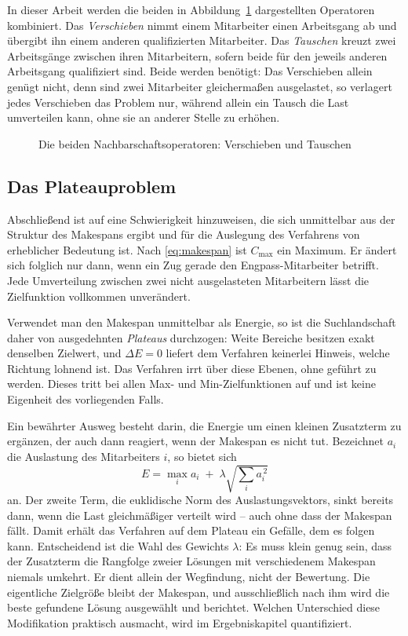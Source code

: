 In dieser Arbeit werden die beiden in Abbildung~\ref{abb:nachbarschaft}
dargestellten Operatoren kombiniert. Das \emph{Verschieben}
nimmt einem Mitarbeiter einen Arbeitsgang ab und übergibt ihn einem anderen
qualifizierten Mitarbeiter. Das \emph{Tauschen} kreuzt
zwei Arbeitsgänge zwischen ihren Mitarbeitern, sofern beide für den jeweils
anderen Arbeitsgang qualifiziert sind. Beide werden benötigt: Das Verschieben
allein genügt nicht, denn sind zwei Mitarbeiter gleichermaßen ausgelastet, so
verlagert jedes Verschieben das Problem nur, während allein ein Tausch die Last
umverteilen kann, ohne sie an anderer Stelle zu erhöhen.

\begin{figure}[tb]
  \centering
  
  \caption[Nachbarschaftsoperatoren]{Die beiden Nachbarschaftsoperatoren: Verschieben und Tauschen}
  \label{abb:nachbarschaft}
\end{figure}

\subsection{Das Plateauproblem}

Abschließend ist auf eine Schwierigkeit hinzuweisen, die sich unmittelbar aus
der Struktur des Makespans ergibt und für die Auslegung des Verfahrens von
erheblicher Bedeutung ist. Nach \eqref{eq:makespan} ist $C_{\max}$ ein Maximum.
Er ändert sich folglich nur dann, wenn ein Zug gerade den Engpass-Mitarbeiter
betrifft. Jede Umverteilung zwischen zwei nicht ausgelasteten Mitarbeitern
lässt die Zielfunktion vollkommen unverändert.

Verwendet man den Makespan unmittelbar als Energie, so ist die Suchlandschaft
daher von ausgedehnten \emph{Plateaus} durchzogen: Weite Bereiche
besitzen exakt denselben Zielwert, und $\Delta E = 0$ liefert dem Verfahren
keinerlei Hinweis, welche Richtung lohnend ist. Das Verfahren irrt über diese
Ebenen, ohne geführt zu werden. Dieses  tritt bei allen
Max- und Min-Zielfunktionen auf und ist keine Eigenheit des vorliegenden Falls.

Ein bewährter Ausweg besteht darin, die Energie um einen kleinen Zusatzterm zu
ergänzen, der auch dann reagiert, wenn der Makespan es nicht tut. Bezeichnet
$a_i$ die Auslastung des Mitarbeiters $i$, so bietet sich
\begin{equation}
  E = \max_i a_i \;+\; \lambda \sqrt{\sum_i a_i^{\,2}}
  \label{eq:glaettung}
\end{equation}
an. Der zweite Term, die euklidische Norm des Auslastungsvektors, sinkt bereits
dann, wenn die Last gleichmäßiger verteilt wird -- auch ohne dass der Makespan
fällt. Damit erhält das Verfahren auf dem Plateau ein Gefälle, dem es folgen
kann. Entscheidend ist die Wahl des Gewichts $\lambda$: Es muss klein genug
sein, dass der Zusatzterm die Rangfolge zweier Lösungen mit verschiedenem
Makespan niemals umkehrt. Er dient allein der Wegfindung, nicht der Bewertung.
Die eigentliche Zielgröße bleibt der Makespan, und ausschließlich nach ihm wird
die beste gefundene Lösung ausgewählt und berichtet. Welchen Unterschied diese
Modifikation praktisch ausmacht, wird im Ergebniskapitel quantifiziert.
